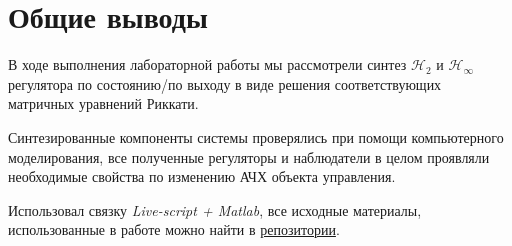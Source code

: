 \chapter{Общие выводы}
\label{ch:chap6}

В ходе выполнения лабораторной работы мы рассмотрели синтез $\mathcal{H}_2$ и $\mathcal{H}_\infty$ регулятора по состоянию/по выходу в виде решения соответствующих матричных уравнений Риккати.

Синтезированные компоненты системы проверялись при помощи компьютерного моделирования, все полученные регуляторы и наблюдатели в целом проявляли необходимые свойства по изменению АЧХ  объекта управления.

Использовал связку \textit{Live-script + Matlab}, все исходные материалы, использованные в работе можно найти  в \href{https://github.com/GreedlyCore/control_theory_course}{репозитории}.

\endinput